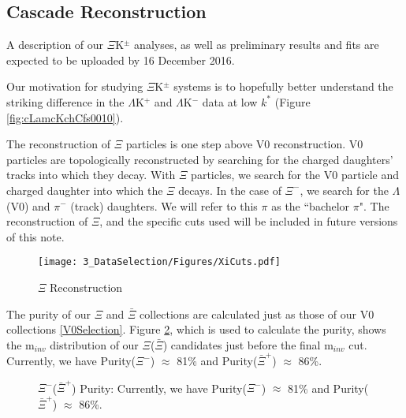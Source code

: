 \documentclass[../AnalysisNoteJBuxton.tex]{subfiles}
\begin{document}
\subsection{Cascade Reconstruction}
\label{CascadeReconstruction}

A description of our $\Xi$K$^{\pm}$ analyses, as well as preliminary results and fits are expected to be uploaded by 16 December 2016.

Our motivation for studying $\Xi$K$^{\pm}$ systems is to hopefully better understand the striking difference in the $\Lambda$K$^{+}$ and $\Lambda$K$^{-}$ data at low $k^{*}$ (Figure \ref{fig:cLamcKchCfs0010}).

The reconstruction of $\Xi$ particles is one step above V0 reconstruction.  V0 particles are topologically reconstructed by searching for the charged daughters' tracks into which they decay.  With $\Xi$ particles, we search for the V0 particle and charged daughter into which the $\Xi$ decays.  In the case of $\Xi^{-}$, we search for the $\Lambda$ (V0) and $\pi^{-}$ (track) daughters.  We will refer to this $\pi$ as the ``bachelor $\pi$".  The reconstruction of $\Xi$, and the specific cuts used will be included in future versions of this note.

\begin{figure}[h]
  \centering
  \texttt{[image: 3\_DataSelection/Figures/XiCuts.pdf]}
  \caption[$\Xi$ Reconstruction]{$\Xi$ Reconstruction}
  \label{fig:XiReconstruction}
\end{figure}

The purity of our $\Xi$ and $\bar{\Xi}$ collections are calculated just as those of our V0 collections \ref{V0Selection}.
Figure \ref{fig:XiPurity}, which is used to calculate the purity, shows the m$_{inv}$ distribution of our $\Xi$($\bar{\Xi}$) candidates just before the final m$_{inv}$ cut.  Currently, we have Purity($\Xi^{-}$) $\approx$ 81\% and Purity($\bar{\Xi}^{+}$) $\approx$ 86\%.

\begin{figure}[h!]
  \centering
  \caption[$\Xi^{-}$($\bar{\Xi}^{+}$) Purity]{$\Xi^{-}$($\bar{\Xi}^{+}$) Purity:  Currently, we have Purity($\Xi^{-}$) $\approx$ 81\% and Purity($\bar{\Xi}^{+}$) $\approx$ 86\%.}
  \label{fig:XiPurity}
\end{figure}
\end{document}

